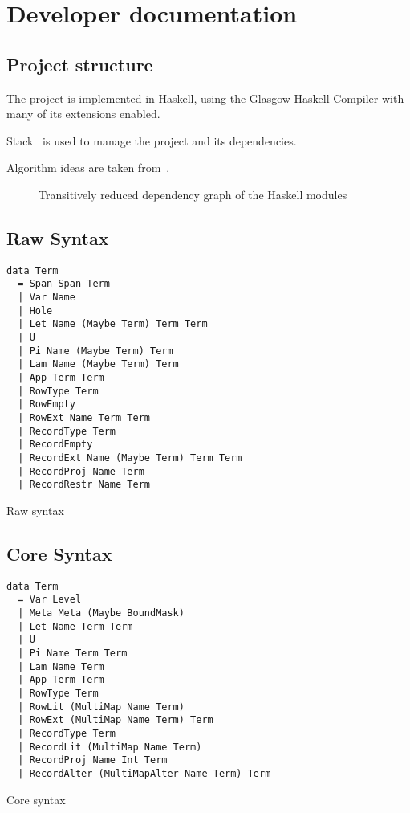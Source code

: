 \chapter{Developer documentation}\label{ch:devdocs}

\section{Project structure}

The project is implemented in Haskell, using the Glasgow Haskell Compiler with
many of its extensions enabled.

Stack~\cite{stack} is used to manage the project and its dependencies.

Algorithm ideas are taken from~\cite{elabzoo}.


\begin{figure}
  \resizebox{\textwidth}{!}{}
  \caption{Transitively reduced dependency graph of the Haskell modules
  }\label{fig:modules}
\end{figure}

\section{Raw Syntax}

\begin{listing}
  \begin{verbatim}
data Term
  = Span Span Term
  | Var Name
  | Hole
  | Let Name (Maybe Term) Term Term
  | U
  | Pi Name (Maybe Term) Term
  | Lam Name (Maybe Term) Term
  | App Term Term
  | RowType Term
  | RowEmpty
  | RowExt Name Term Term
  | RecordType Term
  | RecordEmpty
  | RecordExt Name (Maybe Term) Term Term
  | RecordProj Name Term
  | RecordRestr Name Term
  \end{verbatim}
  \caption{Raw syntax }\label{lst:raw-adt}
\end{listing}

\section{Core Syntax}

\begin{listing}
  \begin{verbatim}
data Term
  = Var Level
  | Meta Meta (Maybe BoundMask)
  | Let Name Term Term
  | U
  | Pi Name Term Term
  | Lam Name Term
  | App Term Term
  | RowType Term
  | RowLit (MultiMap Name Term)
  | RowExt (MultiMap Name Term) Term
  | RecordType Term
  | RecordLit (MultiMap Name Term)
  | RecordProj Name Int Term
  | RecordAlter (MultiMapAlter Name Term) Term
  \end{verbatim}
  \caption{Core syntax }\label{lst:core-adt}
\end{listing}

